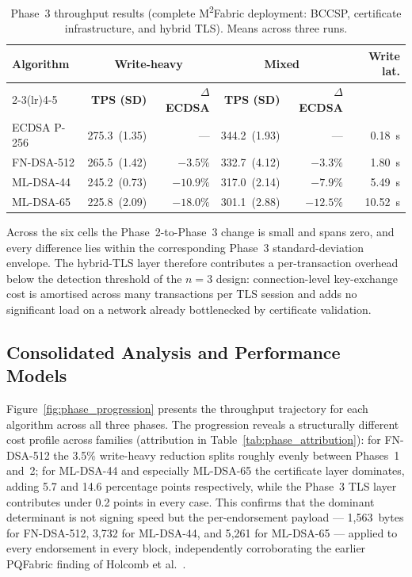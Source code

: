 \documentclass{ieeetj}
\newcommand{\mfabric}{M\textsuperscript{2}Fabric}
\begin{document}
\begin{table}[ht]
\centering
\caption{Phase~3 throughput results (complete \mfabric{} deployment: BCCSP,
certificate infrastructure, and hybrid TLS). Means across three runs.}
\label{tab:phase3_results}
\setlength{\tabcolsep}{3.5pt}
\begin{tabular}{@{}lrrrrr@{}}
\toprule
\textbf{Algorithm} &
\multicolumn{2}{c}{\textbf{Write-heavy}} &
\multicolumn{2}{c}{\textbf{Mixed}} &
\textbf{Write lat.} \\
\cmidrule(lr){2-3}\cmidrule(lr){4-5}
& \textbf{TPS (SD)} & \textbf{$\Delta$ ECDSA} &
  \textbf{TPS (SD)} & \textbf{$\Delta$ ECDSA} & \\
\midrule
ECDSA P-256 & 275.3~(1.35) & — & 344.2~(1.93) & — & 0.18~s \\
FN-DSA-512  & 265.5~(1.42) & $-3.5\%$ & 332.7~(4.12) & $-3.3\%$ & 1.80~s \\
ML-DSA-44   & 245.2~(0.73) & $-10.9\%$ & 317.0~(2.14) & $-7.9\%$ & 5.49~s \\
ML-DSA-65   & 225.8~(2.09) & $-18.0\%$ & 301.1~(2.88) & $-12.5\%$ & 10.52~s \\
\bottomrule
\end{tabular}
\end{table}

Across the six cells the Phase~2-to-Phase~3 change is small and spans zero, and
every difference lies within the corresponding Phase~3 standard-deviation
envelope. The hybrid-TLS layer therefore contributes a per-transaction overhead
below the detection threshold of the $n=3$ design: connection-level key-exchange
cost is amortised across many transactions per TLS session and adds no
significant load on a network already bottlenecked by certificate validation.

\subsection{Consolidated Analysis and Performance Models}
\label{sec:res_consolidated}

Figure~\ref{fig:phase_progression} presents the throughput trajectory for each
algorithm across all three phases. The progression reveals a structurally
different cost profile across families (attribution in
Table~\ref{tab:phase_attribution}): for FN-DSA-512 the 3.5\% write-heavy
reduction splits roughly evenly between Phases~1 and~2; for ML-DSA-44 and
especially ML-DSA-65 the certificate layer dominates, adding 5.7 and 14.6
percentage points respectively, while the Phase~3 TLS layer contributes under 0.2
points in every case. This confirms that the dominant determinant is not signing
speed but the per-endorsement payload --- 1{,}563~bytes for FN-DSA-512, 3{,}732
for ML-DSA-44, and 5{,}261 for ML-DSA-65 --- applied to every endorsement in
every block, independently corroborating the earlier PQFabric finding of Holcomb
et al.~\cite{holcomb2021}.
\end{document}
